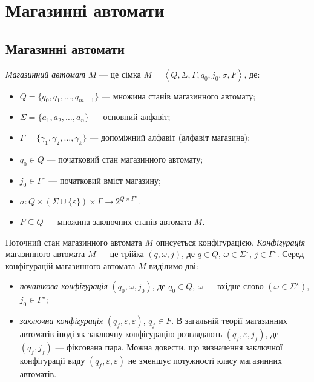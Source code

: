 \setcounter{section}{7}

\section{Магазинні автомати}

\subsection{Магазинні автомати}

\textit{Магазинний автомат} $M$ --- це сімка $M = \left\langle Q, \Sigma, \Gamma, q_0, j_0, \sigma, F \right\rangle$, де: 
\begin{itemize}
	\item $Q = \{q_0, q_1, \ldots, q_{m - 1}\}$ --- множина станів магазинного автомату;
	\item $\Sigma = \{a_1, a_2, \ldots, a_n\}$ --- основний алфавіт;
	\item $\Gamma = \{\gamma_1, \gamma_2, \ldots, \gamma_k\}$ --- допоміжний алфавіт (алфавіт
	магазина);
	\item $q_0 \in Q$ --- початковий стан магазинного автомату;
	\item $j_0 \in \Gamma^\star$ --- початковий вміст магазину;
	\item $\sigma: Q \times (\Sigma \cup \{\varepsilon\}) \times \Gamma \to 2^{Q \times 
	\Gamma^\star}$.
	\item $F \subseteq Q$ --- множина заключних станів автомата $M$.
\end{itemize}

Поточний стан магазинного автомата $M$ описується конфігурацією. \textit{Конфігурація} магазинного автомата $M$ --- це трійка $(q, \omega, j)$, де $q \in Q$, $\omega \in \Sigma^\star$, $j \in \Gamma^\star$. Серед конфігурацій магазинного автомата $M$ виділимо дві:
\begin{itemize}
	\item \textit{початкова конфігурація} $(q_0, \omega, j_0)$, де $q_0 \in Q$, $\omega$ --- вхідне слово $(\omega \in \Sigma^\star)$, $j_0 \in \Gamma^\star$;
	\item \textit{заключна конфігурація} $(q_f, \varepsilon, \varepsilon)$, $q_f \in F$. В загальній теорії магазинних автоматів іноді як заключну конфігурацію розглядають $(q_f, \varepsilon, j_f)$, де $(q_f, j_f)$ --- фіксована пара. Можна довести, що визначення заключної конфігурації виду $(q_f, \varepsilon, \varepsilon)$ не зменшує потужності класу магазинних автоматів.
\end{itemize}


